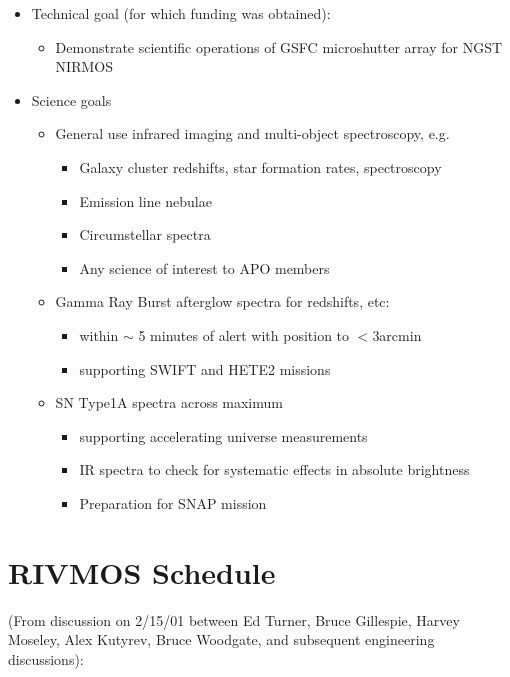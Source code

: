\documentclass{article}
\begin{document}
\begin{itemize}
\item Technical goal (for which funding was obtained):
  \begin{itemize}
   \item Demonstrate scientific operations of GSFC microshutter array for
    NGST NIRMOS
  \end{itemize}

\item Science goals
  \begin{itemize}
   \item General use infrared imaging and multi-object spectroscopy, e.g.
   \begin{itemize}
    \item Galaxy cluster redshifts, star formation rates, spectroscopy
    \item Emission line nebulae
    \item Circumstellar spectra
    \item Any science of interest to APO members
   \end{itemize}
   \item Gamma Ray Burst afterglow spectra for redshifts, etc:
    \begin{itemize}
     \item within $\sim$ 5 minutes of alert with position to $<$3arcmin
     \item supporting SWIFT and HETE2 missions
    \end{itemize}
   \item SN Type1A spectra across maximum
    \begin{itemize}
     \item supporting accelerating universe measurements
     \item IR spectra to check for systematic effects in absolute brightness
     \item Preparation for SNAP mission
    \end{itemize}
  \end{itemize} 
\end{itemize}

\section{RIVMOS Schedule}

(From discussion on 2/15/01 between Ed Turner, Bruce Gillespie, Harvey
Moseley, Alex Kutyrev, Bruce Woodgate, and subsequent engineering discussions):
\end{document}
